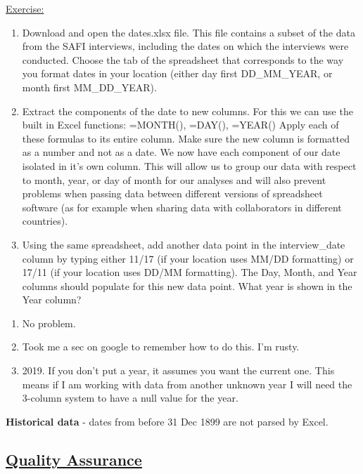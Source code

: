 \documentclass[12pt]{article}
\begin{document}
\color{gray}
\vspace{1em}
\underline{Exercise:}
\begin{enumerate}
    \item Download and open the dates.xlsx file. This file contains a subset of the data from the SAFI interviews, including the dates on which the interviews were conducted.
    \newline Choose the tab of the spreadsheet that corresponds to the way you format dates in your location (either day first DD\_MM\_YEAR, or month first MM\_DD\_YEAR).
    \item Extract the components of the date to new columns. For this we can use the built in Excel functions:
    \newline =MONTH(), =DAY(), =YEAR()
    \newline Apply each of these formulas to its entire column. Make sure the new column is formatted as a number and not as a date.
    \newline We now have each component of our date isolated in it’s own column. This will allow us to group our data with respect to month, year, or day of month for our analyses and will also prevent problems when passing data between different versions of spreadsheet software (as for example when sharing data with collaborators in different countries).
    \item Using the same spreadsheet, add another data point in the interview\_date column by typing either 11/17 (if your location uses MM/DD formatting) or 17/11 (if your location uses DD/MM formatting). The Day, Month, and Year columns should populate for this new data point. What year is shown in the Year column?
\end{enumerate}
\color{black}
\begin{enumerate}
    \item No problem.
    \item Took me a sec on google to remember how to do this. I'm rusty.
    \item 2019. If you don't put a year, it assumes you want the current one. This means if I am working with data from another unknown year I will need the 3-column system to have a null value for the year.
\end{enumerate}

\textbf{Historical data} - dates from before 31 Dec 1899 are not parsed by Excel. 

\newpage
\subsection{\href{https://datacarpentry.org/spreadsheets-socialsci/04-quality-assurance/index.html}{\textbf{Quality Assurance}}}
\end{document}
